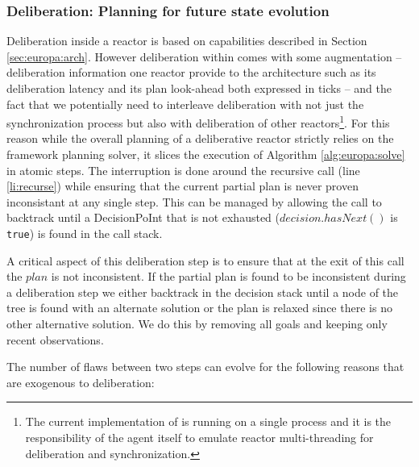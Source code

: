 \subsubsection{Deliberation: Planning for future state evolution}
\label{sec:arch:plan}

Deliberation inside a reactor is based on \eu capabilities described
in Section \ref{sec:europa:arch}. However deliberation within \rx
comes with some augmentation -- deliberation information one reactor
provide to the architecture such as its deliberation latency and its
plan look-ahead both expressed in ticks -- and the fact that we
potentially need to interleave deliberation with not just the
synchronization process but also with deliberation of other
reactors\footnote{The current implementation of \rx is running on a
  single process and it is the responsibility of the agent itself to
  emulate reactor multi-threading for deliberation and
  synchronization.}. For this reason while the overall planning of a
deliberative reactor strictly relies on the \eu framework planning
solver, it slices the execution of Algorithm \ref{alg:europa:solve} in
atomic steps. The interruption is done around the recursive call (line
\ref{li:recurse}) while ensuring that the current partial plan is
never proven inconsistant at any single step. This can be managed by
allowing the call to backtrack until a \textsf{DecisionPoInt} that is
not exhausted (\ie $decision.hasNext()$ is \texttt{true}) is found in
the call stack.

A critical aspect of this deliberation step is to ensure that at the
exit of this call the $plan$ is not inconsistent. %
If the partial plan is found to be inconsistent during a deliberation
step we either backtrack in the decision stack until a node of the
tree is found with an alternate solution or the plan is relaxed since
there is no other alternative solution. We do this by removing all
goals and keeping only recent observations. %

The number of flaws between two steps  can evolve for the following reasons that are exogenous
to deliberation:

